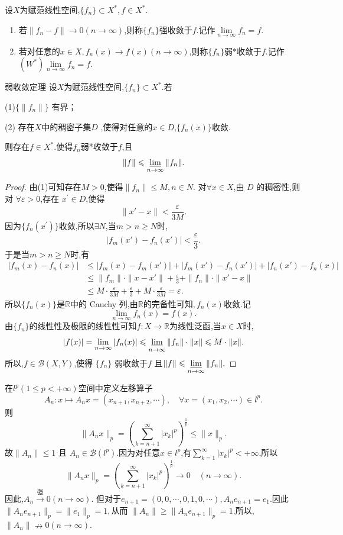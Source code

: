 \documentclass[lang=cn,18pt]{elegantbook}
\begin{document}
\begin{definition}
    设$X$为赋范线性空间,$\{f_n\}\subset X^*,f \in X^*$.
    \begin{enumerate}
        \item 若$\|f_n-f\| \to 0(n \to \infty)$,则称$\{f_n\}$强收敛于$f$.记作$\lim\limits_{n\to \infty}f_n =f$.
        \item 若对任意的$x \in X,f_n(x)\to f(x)(n\to \infty)$,则称$\{f_n\}$弱$*$收敛于$f$.记作$(W^*)\lim\limits_{n\to \infty}f_n=f$.
    \end{enumerate}
\end{definition}

\begin{theorem}{弱收敛定理}
    设$X$为赋范线性空间,$\{f_n\}\subset X^*$.若

(1)$\{\|f_n\|\}$ 有界；

(2) 存在$X$中的稠密子集$D$ ,使得对任意的$x\in D$,$\{f_n(x)\}$收敛.

则存在$f\in X^*$.使得$f_n$弱*收敛于$f$,且 $$\|f\|\leqslant\varliminf\limits_{n\to\infty}\|f_n\|.$$
\end{theorem}
\begin{proof}
   由(1)可知存在$M>0$,使得$\|f_n\|\leqslant M,n\in N.$
对$\forall x\in X$,由 $D$ 的稠密性,则对 $\forall\varepsilon>0$,存在 $x^\prime\in D$,使得
$$\|x'-x\|<\frac{\varepsilon}{3M}.$$
因为$\{f_{n}(x^{\prime})\}$收敛,所以$\exists N$,当$m>n\geqslant N$时,
$$|f_m(x')-f_n(x')|<\frac{\varepsilon}{3}.$$
于是当$m>n\geqslant N$时,有
\begin{align*}
    |f_{m}(x)-f_{n}(x)|& \leqslant|f_{m}(x)-f_{m}(x')|+|f_{m}(x')-f_{n}(x')|+|f_{n}(x')-f_{n}(x)| \\
    & \leqslant\|f_m\|\cdot\|x-x'\|+\frac{\varepsilon}{3}+\|f_n\|\cdot\|x'-x\| \\
    & \leqslant M\cdot\frac{\varepsilon}{3M}+\frac{\varepsilon}{3}+M\cdot\frac{\varepsilon}{3M}=\varepsilon.
\end{align*}
所以$\{f_n(x)\}$是$\mathbb{R}$中的 Cauchy 列,由$\mathbb{R}$的完备性可知$,f_n(x)$收敛.记
$$\lim_{n\to\infty}f_n(x)=f(x).$$
由$\{f_n\}$的线性性及极限的线性性可知$f:X\to \mathbb{R}$为线性泛函,当$x\in X$时,
$$|f(x)|=\lim\limits_{n\to\infty}|f_n(x)|\leqslant\varliminf\limits_{n\to\infty}\|f_n\|\cdot\|x\|\leqslant M\cdot\|x\|.$$
所以,$f\in\mathscr{B}(X,Y)$,使得 $\{f_n\}$ 弱收敛于$f$ 且$\|f\|\leqslant\varliminf\limits_{n\to\infty}\|f_n\|.$
\end{proof}
\begin{example}
    在$l^p(1\leqslant p<+\infty)$空间中定义左移算子 
    $$A_n:x\mapsto A_nx=(x_{n+1},x_{n+2},\cdots),\quad\forall x=(x_1,x_2,\cdots)\in l^p.$$
     则$$\|A_nx\|_p=\left(\sum\limits_{k=n+1}^\infty|x_k|^p\right)^\frac{1}{p}\leqslant\|x\|_p.$$
     故$\|A_n\|\leqslant 1$ 且 $A_n\in \mathscr{B}(l^p).$因为对任意$x \in l^p$,有$\sum\limits_{k=1}^\infty|x_k|^p<+\infty$,所以$$\|A_nx\|_p=\left(\sum_{k=n+1}^\infty|x_k|^p\right)^{\frac1p}\to0\quad(n\to\infty).$$
     因此,$A_n\xrightarrow{\text{强}}0(n\to\infty).$
     但对于$e_{n+1}=(0,0,\cdots,0,1,0,\cdots),A_ne_{n+1}=e_1.$因此 $\|A_ne_{n+1}\|_p=\|e_1\|_p=1,$从而 $\|A_n\|\geqslant\|A_n e_{n+1}\|_p=1$.所以,$\|A_n\| \nrightarrow 0 (n\to\infty).$
\end{example}
\end{document}
